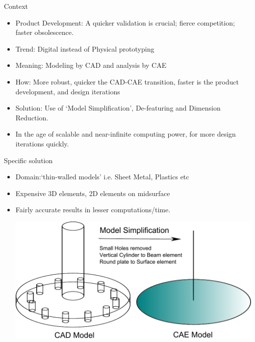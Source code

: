 \begin{frame}{Context}
\begin{itemize}[noitemsep,label=\textbullet,topsep=2pt,parsep=2pt,partopsep=2pt]
\item Product Development: A quicker validation is crucial; fierce competition; faster obsolescence.
\item Trend: Digital instead of Physical prototyping
\item Meaning: Modeling by CAD and analysis by CAE
\item How: More robust, quicker the CAD-CAE transition, faster is the product development, and design iterations
\item Solution: Use of `Model Simplification', De-featuring and Dimension Reduction.
\item  In the age of scalable and near-infinite computing power, for more design iterations quickly. 
\end{itemize}


\end{frame}

\begin{frame}{Specific solution}
\begin{itemize}[noitemsep,label=\textbullet,topsep=2pt,parsep=2pt,partopsep=2pt]
\item Domain:`thin-walled models' i.e. Sheet Metal, Plastics etc
\item Expensive 3D elements, 2D elements on midsurface
\item Fairly accurate results in lesser computations/time.

\vspace{1cm}

\includegraphics[width=0.8\linewidth]{../Common/images/ModelSimplification.pdf}
\end{itemize}


\end{frame}


